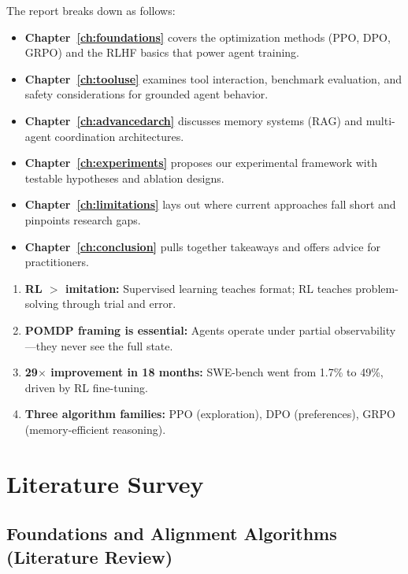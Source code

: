 \documentclass[12pt,a4paper]{report}
\theoremstyle{definition}
\begin{document}
The report breaks down as follows:
\begin{itemize}
    \item \textbf{Chapter~\ref{ch:foundations}} covers the optimization methods (PPO, DPO, GRPO) and the RLHF basics that power agent training.
    \item \textbf{Chapter~\ref{ch:tooluse}} examines tool interaction, benchmark evaluation, and safety considerations for grounded agent behavior.
    \item \textbf{Chapter~\ref{ch:advancedarch}} discusses memory systems (RAG) and multi-agent coordination architectures.
    \item \textbf{Chapter~\ref{ch:experiments}} proposes our experimental framework with testable hypotheses and ablation designs.
    \item \textbf{Chapter~\ref{ch:limitations}} lays out where current approaches fall short and pinpoints research gaps.
    \item \textbf{Chapter~\ref{ch:conclusion}} pulls together takeaways and offers advice for practitioners.
\end{itemize}

\begin{tcolorbox}[colback=cyan!5!white, colframe=cyan!60!black, title=\textbf{Chapter 1 Key Takeaways}]
\begin{enumerate}
    \item \textbf{RL $>$ imitation:} Supervised learning teaches format; RL teaches problem-solving through trial and error.
    \item \textbf{POMDP framing is essential:} Agents operate under partial observability---they never see the full state.
    \item \textbf{29$\times$ improvement in 18 months:} SWE-bench went from 1.7\% to 49\%, driven by RL fine-tuning.
    \item \textbf{Three algorithm families:} PPO (exploration), DPO (preferences), GRPO (memory-efficient reasoning).
\end{enumerate}
\end{tcolorbox}



\part{Literature Survey}

\chapter{Foundations and Alignment Algorithms (Literature Review)}
\end{document}
